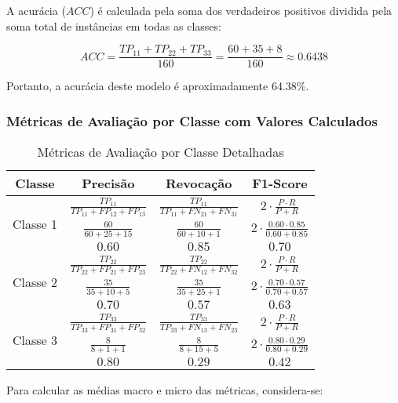 A acurácia (\(ACC\)) é calculada pela soma dos verdadeiros positivos dividida pela soma total de instâncias em todas as classes:

\[ ACC = \frac{TP_{11} + TP_{22} + TP_{33}}{160} = \frac{60 + 35 + 8}{160} \approx 0.6438 \]

Portanto, a acurácia deste modelo é aproximadamente 64.38\%.

\subsubsection{Métricas de Avaliação por Classe com Valores Calculados}

\begin{table}[h]
\centering
\caption{Métricas de Avaliação por Classe Detalhadas}
\label{tab:detailed_evaluation_metrics}
\begin{tabular}{|c|c|c|c|}
\hline
\textbf{Classe} & \textbf{Precisão} & \textbf{Revocação} & \textbf{F1-Score} \\
\hline
\multirow{3}{*}{Classe 1} & \(\frac{TP_{11}}{TP_{11} + FP_{12} + FP_{13}}\) & \(\frac{TP_{11}}{TP_{11} + FN_{21} + FN_{31}}\) & \(2 \cdot \frac{P \cdot R}{P + R}\) \\
 & \(\frac{60}{60 + 25 + 15}\) & \(\frac{60}{60 + 10 + 1}\) & \(2 \cdot \frac{0.60 \cdot 0.85}{0.60 + 0.85}\) \\
 & \(0.60\) & \(0.85\) & \(0.70\) \\
\hline
\multirow{3}{*}{Classe 2} & \(\frac{TP_{22}}{TP_{22} + FP_{21} + FP_{23}}\) & \(\frac{TP_{22}}{TP_{22} + FN_{12} + FN_{32}}\) & \(2 \cdot \frac{P \cdot R}{P + R}\) \\
 & \(\frac{35}{35 + 10 + 5}\) & \(\frac{35}{35 + 25 + 1}\) & \(2 \cdot \frac{0.70 \cdot 0.57}{0.70 + 0.57}\) \\
 & \(0.70\) & \(0.57\) & \(0.63\) \\
\hline
\multirow{3}{*}{Classe 3} & \(\frac{TP_{33}}{TP_{33} + FP_{31} + FP_{32}}\) & \(\frac{TP_{33}}{TP_{33} + FN_{13} + FN_{23}}\) & \(2 \cdot \frac{P \cdot R}{P + R}\) \\
 & \(\frac{8}{8 + 1 + 1}\) & \(\frac{8}{8 + 15 + 5}\) & \(2 \cdot \frac{0.80 \cdot 0.29}{0.80 + 0.29}\) \\
 & \(0.80\) & \(0.29\) & \(0.42\) \\
\hline
\end{tabular}
\end{table}



Para calcular as médias macro e micro das métricas, considera-se:

